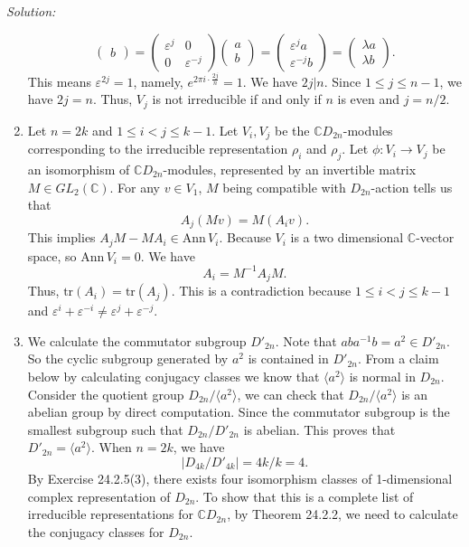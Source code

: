 \documentclass[a4paper, 12pt]{article}
\newenvironment{solution}
    {\textit{Solution:}}
    {}
\newcommand{\la}{\langle}
\newcommand{\ra}{\rangle}
\newcommand{\Ann}{\text{Ann}\,}
\newcommand{\tr}{\text{tr}}
\begin{document}
\begin{solution}
\begin{enumerate}[(1)]
\[\begin{pmatrix}
	b
\end{pmatrix}=\begin{pmatrix}
\varepsilon^j&0\\ 
0&\varepsilon^{-j}
\end{pmatrix}\begin{pmatrix}
a\\ 
b
\end{pmatrix}=\begin{pmatrix}
\varepsilon^ja\\ 
\varepsilon^{-j}b
\end{pmatrix}=\begin{pmatrix}
	\lambda a\\
	\lambda b
\end{pmatrix}.\]
This means \(\varepsilon^{2j}=1\), namely, \(e^{2\pi i\cdot \frac{2j}{n}}=1\). We have \(2j|n\). Since \(1\leq j\leq n-1\), we have \(2j=n\). Thus, \(V_j\) is not irreducible if and only if \(n\) is even and \(j=n/2\). 
\item Let \(n=2k\) and \(1\leq i<j\leq k-1\). Let \(V_i,V_j\) be the \(\mathbb{C}D_{2n}\)-modules corresponding to the irreducible representation \(\rho_i\) and \(\rho_j\). Let \(\phi:V_i\rightarrow V_j\) be an isomorphism of \(\mathbb{C}D_{2n}\)-modules, represented by 
an invertible matrix \(M\in GL_2(\mathbb{C})\). For any \(v\in V_1\), \(M\) being compatible with \(D_{2n}\)-action tells us that 
\[A_j(Mv)=M(A_iv).\]
This implies \(A_jM-MA_i\in \Ann V_i\). Because \(V_i\) is a two dimensional \(\mathbb{C}\)-vector space, so \(\Ann V_i=0\). We have 
\[A_i=M^{-1}A_jM.\]
Thus, \(\tr(A_i)=\tr(A_j)\). This is a contradiction because \(1\leq i<j\leq k-1\) and \(\varepsilon^{i}+\varepsilon^{-i}\neq \varepsilon^{j}+\varepsilon^{-j}\). 
\item We calculate the commutator subgroup \(D'_{2n}\). Note that \(aba^{-1}b=a^2\in D'_{2n}\). So the cyclic subgroup generated by \(a^2\) is contained in \(D'_{2n}\). From a claim below by calculating conjugacy classes we know that \(\la a^2\ra\) is normal in \(D_{2n}\). Consider the quotient group \(D_{2n}/\la a^2\ra\), we can check that \(D_{2n}/\la a^2\ra\) is an abelian group by direct computation. Since the commutator subgroup 
is the smallest subgroup such that \(D_{2n}/D'_{2n}\) is abelian. This proves that \(D'_{2n}=\la a^2\ra\). When \(n=2k\), we have 
\[|D_{4k}/D'_{4k}|=4k/k=4.\]
By Exercise 24.2.5(3), there exists four isomorphism classes of 1-dimensional complex representation of \(D_{2n}\). To show that this is a complete list of irreducible representations for \(\mathbb{C}D_{2n}\), by Theorem 24.2.2, we need to calculate the conjugacy classes for \(D_{2n}\). 

\end{enumerate}
\end{solution}
\end{document}
